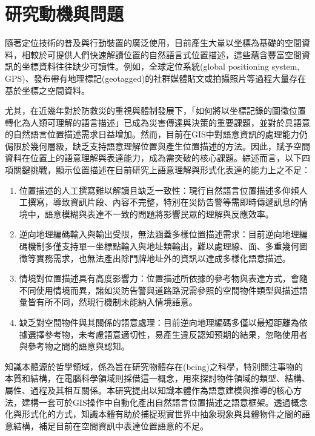 

\section{研究動機與問題}

隨著定位技術的普及與行動裝置的廣泛使用，目前產生大量以坐標為基礎的空間資料，相較於可提供人們快速解讀位置的自然語言式位置描述，這些蘊含豐富空間資訊的坐標資料往往缺少可讀性。例如，全球定位系統(global positioning system, GPS)、發布帶有地理標記(geotagged)的社群媒體貼文或拍攝照片等過程大量存在基於坐標之空間資料。

尤其，在近幾年對於防救災的重視與體制發展下，「如何將以坐標記錄的圖徵位置轉化為人類可理解的語言描述」已成為災害傳達與決策的重要課題，並對於具語意的自然語言位置描述需求日益增加。然而，目前在GIS中對語意資訊的處理能力仍侷限於幾何層級，缺乏支持語意理解位置與產生位置描述的方法。因此，賦予空間資料在位置上的語意理解與表達能力，成為需突破的核心課題。綜述而言，以下四項關鍵挑戰，顯示位置描述在目前研究上語意理解與形式化表達的能力上之不足：

\begin{enumerate}
\item 位置描述的人工撰寫難以解讀且缺乏一致性：現行自然語言位置描述多仰賴人工撰寫，導致資訊片段、內容不完整，特別在災防告警等需即時傳遞訊息的情境中，語意模糊與表達不一致的問題將影響民眾的理解與反應效率。
    \item 逆向地理編碼輸入與輸出受限，無法涵蓋多樣位置描述需求：目前逆向地理編碼機制多僅支持單一坐標點輸入與地址類輸出，難以處理線、面、多重幾何圖徵等實務需求，也無法產出除門牌地址外的資訊以達成多樣化語意描述。
    \item 情境對位置描述具有高度影響力：位置描述所依據的參考物與表達方式，會隨不同使用情境而異，諸如災防告警與道路路況需參照的空間物件類型與描述語彙皆有所不同，然現行機制未能納入情境語意。
    \item 缺乏對空間物件與其關係的語意處理：目前逆向地理編碼多僅以最短距離為依據選擇參考物，未考慮語意適切性，易產生違反認知預期的結果，忽略使用者與參考物之間的語意與認知。
\end{enumerate}

知識本體源於哲學領域，係為旨在研究物體存在(being)之科學，特別關注事物的本質和結構，在電腦科學領域則採借這一概念，用來探討物件領域的類型、結構、屬性、過程及其相互關係\parencite{RN160, RN92}。本研究提出以知識本體作為語意建模與推導的核心方法，建構一套可於GIS操作中自動化產出自然語言位置描述之語意框架。透過概念化與形式化的方式，知識本體有助於捕捉現實世界中抽象現象與具體物件之間的語意結構，補足目前在空間資訊中表達位置語意的不足。

